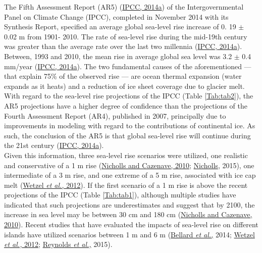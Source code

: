 \documentclass{article} %
\begin{document}
The Fifth Assessment Report (AR5) (\hyperlink{ipcc}{IPCC, 2014a}) of the Intergovernmental Panel on
Climate Change (IPCC), completed in November 2014 with its Synthesis Report,
specified an average global sea-level rise increase of 0. 19 $\pm$ 0.02 m from 1901-
2010. The rate of sea-level rise during the mid-19th century was greater than the
average rate over the last two millennia (\hyperlink{ipcc}{IPCC, 2014a}). Between, 1993 and 2010,
the mean rise in average global sea level was 3.2 $\pm$ 0.4 mm/year (\hyperlink{ipcc}{IPCC, 2014a}). The
two fundamental causes of the aforementioned —that explain 75\% of the observed
rise — are ocean thermal expansion (water expands as it heats) and a reduction of
ice sheet coverage due to glacier melt. With regard to the sea-level rise projections
of the IPCC (Table \ref{Tab:tab2}), the AR5 projections have a higher degree of confidence than
the projections of the Fourth Assessment Report (AR4), published in 2007, principally
due to improvements in modeling with regard to the contributions of continental ice.
As such, the conclusion of the AR5 is that global sea-level rise will continue during
the 21st century (\hyperlink{ipcc}{IPCC, 2014a}).\\

Given this information, three sea-level rise scenarios were utilized, one realistic
and conservative of a 1 m rise (\hyperlink{nicholls3}{Nicholls and Cazenave, 2010}; \hyperlink{nicholls}{Nicholls}, 2015), one
intermediate of a 3 m rise, and one extreme of a 5 m rise, associated with ice cap
melt (\hyperlink{wetzel}{Wetzel \textit{et al.,} 2012}). If the first scenario of a 1 m rise is above the recent
projections of the IPCC (Table \ref{Tab:tab1}), although multiple studies have indicated
that such projections are underestimates and suggest that by 2100, the increase in
sea level may be between 30 cm and 180 cm (\hyperlink{nicholls}{Nicholls and Cazenave, 2010}). Recent
studies that have evaluated the impacts of sea-level rise on different islands have
utilized scenarios between 1 m and 6 m (\hyperlink{bellard}{Bellard \textit{et al.,}} 2014; \hyperlink{wetzel}{Wetzel \textit{et al.,} 2012}; \hyperlink{reynolds}{Reynolds \textit{et al.,}} 2015).\\
\end{document}
